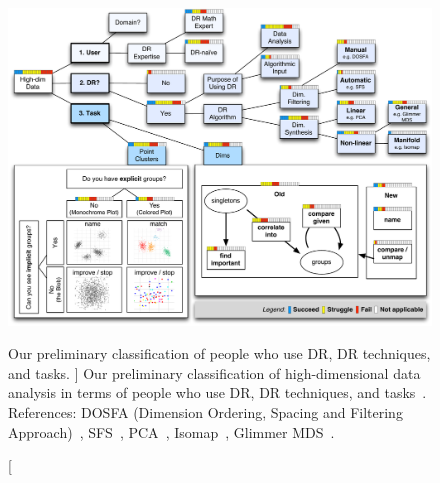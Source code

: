 
\begin{figure}
    \centering
    \includegraphics[width=\textwidth]{figures/dritw-taxonomy-1.pdf}
    \caption
    [
        Our preliminary classification of people who use \ac{DR}, \ac{DR} techniques, and tasks.
    ]
    {
        Our preliminary classification of high-dimensional data analysis in terms of people who use \ac{DR}, \ac{DR} techniques, and tasks~\cite{Sedlmair2012b}. References: DOSFA (Dimension Ordering, Spacing and Filtering Approach)~\cite{Yang2003}, \ac{SFS}~\cite{Jain2000}, \ac{PCA}~\cite{Jolliffe2002}, Isomap~\cite{Tenenbaum2000}, Glimmer \ac{MDS}~\cite{Ingram2009}.  
    }
    \label{fig:dritw-taxonomy-1}
    \centering
\end{figure}



